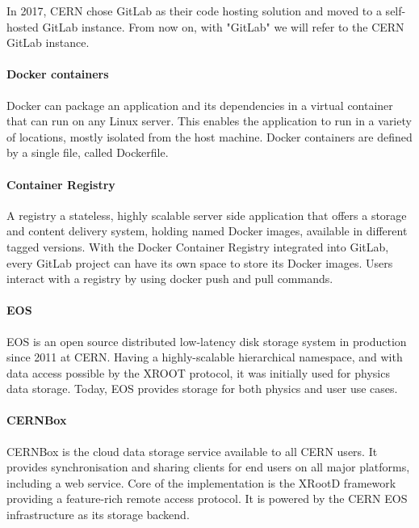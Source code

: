 In 2017, CERN chose GitLab as their code hosting solution and moved to a self-hosted GitLab instance. From now on, with "GitLab" we will refer to the CERN GitLab instance.

\paragraph{Docker containers}

Docker can package an application and its dependencies in a virtual container that can run on any Linux server. This enables the application to run in a variety of locations, mostly isolated from the host machine. Docker containers are defined by a single file, called Dockerfile.

\paragraph{Container Registry}

A registry a stateless, highly scalable server side application that offers a storage and content delivery system, holding named Docker images, available in different tagged versions. With the Docker Container Registry integrated into GitLab, every GitLab project can have its own space to store its Docker images. Users interact with a registry by using docker push and pull commands.

\paragraph{EOS}

EOS \cite{Peters_2015} is an open source distributed low-latency disk storage system in production since 2011 at CERN. Having a highly-scalable hierarchical namespace, and with data access possible by the XROOT protocol, it was initially used for physics data storage. Today, EOS provides storage for both physics and user use cases.

\paragraph{CERNBox}

CERNBox \cite{Mascetti_2015} is the cloud data storage service available to all CERN users. It provides synchronisation and sharing clients for end users on all major platforms, including a web service. Core of the implementation is the XRootD framework providing a feature-rich remote access protocol. It is powered by the CERN EOS infrastructure as its storage backend.

